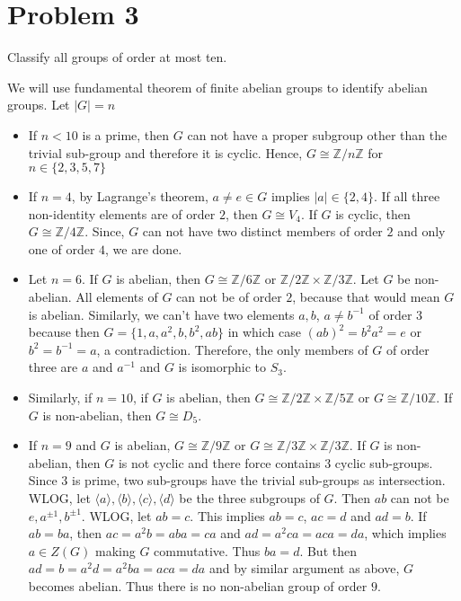 \documentclass[12pt]{article}
\begin{document}
    \newcommand{\Z}[1]{\mathbb{Z}/{#1}\mathbb{Z}}
  \section*{Problem 3}
  Classify all groups of order at most ten.
  

     \noindent We will use fundamental theorem of finite abelian groups to identify abelian groups. Let $|G| = n$
     \begin{itemize}
         \item If $n < 10$ is a prime, then $G$ can not have a proper subgroup other than the trivial sub-group and therefore it is cyclic. Hence, $G \cong \mathbb{Z}/n\mathbb{Z}$ for $n \in \{2, 3, 5, 7\}$
         \item If $n = 4$, by Lagrange's theorem, $a \neq e \in G$ implies $|a| \in \{2, 4\}$. If all three non-identity elements are of order $2$, then $G \cong V_4$. If $G$ is cyclic, then $G \cong \mathbb{Z}/4\mathbb{Z}$. Since, $G$ can not have two distinct members of order $2$ and only one of order $4$, we are done.
         \item Let $n = 6$. If $G$ is abelian, then $G \cong \mathbb{Z}/6\mathbb{Z}$ or $\mathbb{Z}/2\mathbb{Z} \times \mathbb{Z}/3\mathbb{Z}$. Let $G$ be non-abelian. All elements of $G$ can not be of order $2$, because that would mean $G$ is abelian. Similarly, we can't have two elements $a, b$, $a \neq b^{-1}$ of order $3$ because then $G = \{1, a, a^2, b, b^2, ab\}$ in which case $(ab)^2 = b^2a^2 = e$ or $b^2 = b^{-1} = a$, a contradiction. Therefore, the only members of $G$ of order three are $a$ and $a^{-1}$ and $G$ is isomorphic to $S_3$. 
         \item Similarly, if $n = 10$, if $G$ is abelian, then $G \cong \Z{2} \times \Z{5}$ or $G \cong \Z{10}$. If $G$ is non-abelian, then $G \cong D_5$.
         \item If $n = 9$ and $G$ is abelian, $G \cong  \Z{9} $ or $G \cong \Z{3} \times \Z{3}$. If $G$ is non-abelian, then $G$ is not cyclic and there force contains $3$ cyclic sub-groups. Since $3$ is prime, two sub-groups have the trivial sub-groups as intersection. WLOG, let $\langle a\rangle, \langle b\rangle, \langle c\rangle, \langle d\rangle$ be the three subgroups of $G$. Then $ab$ can not be $e, a^{\pm 1}, b^{\pm 1}$. WLOG, let $ab = c$. This implies $ab = c$, $ac = d$ and $ad = b$. If $ab = ba$, then $ac = a^2 b = aba = ca$ and $ad = a^2ca = aca = da$, which implies $a \in Z(G)$ making $G$ commutative. Thus $ba = d$. But then $ad = b = a^2d = a^2ba = aca = da$ and by similar argument as above, $G$ becomes abelian. Thus there is no non-abelian group of order $9$.


\end{itemize}
\end{document}

